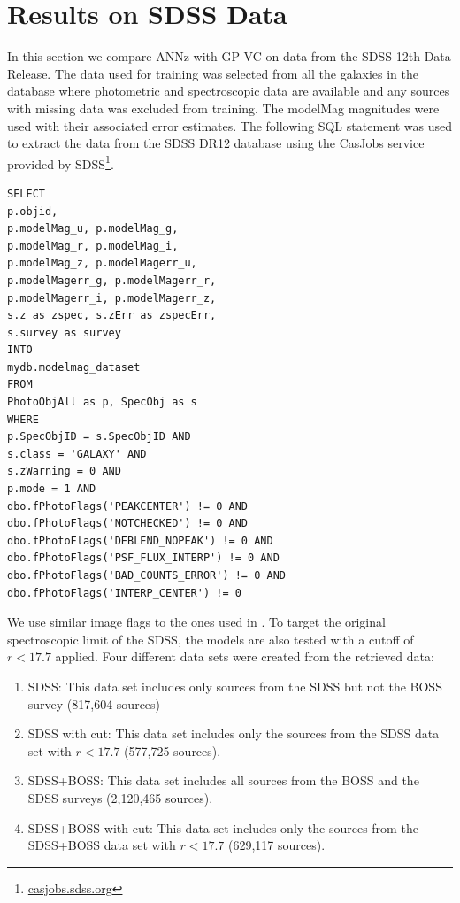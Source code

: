 \documentclass[useAMS,usenatbib,fleqn]{mn2e}
\begin{document}
\section{Results on SDSS Data}
\label{sec-experiments-sdss}

In this section we compare {\sc ANNz} with GP-VC on data from the SDSS 12th Data Release. The data used for training was selected from all the galaxies in the database where photometric and spectroscopic data are available and any sources with missing data was excluded from training. The {\selectfont modelMag} magnitudes were used with their associated error estimates. The following SQL statement was used to extract the data from the SDSS DR12 database using the CasJobs service provided by SDSS\footnote{\url{casjobs.sdss.org}}.

\begin{verbatim}
SELECT
p.objid,
p.modelMag_u, p.modelMag_g,
p.modelMag_r, p.modelMag_i,
p.modelMag_z, p.modelMagerr_u,
p.modelMagerr_g, p.modelMagerr_r,
p.modelMagerr_i, p.modelMagerr_z,
s.z as zspec, s.zErr as zspecErr,
s.survey as survey
INTO
mydb.modelmag_dataset
FROM
PhotoObjAll as p, SpecObj as s
WHERE
p.SpecObjID = s.SpecObjID AND
s.class = 'GALAXY' AND 
s.zWarning = 0 AND
p.mode = 1 AND
dbo.fPhotoFlags('PEAKCENTER') != 0 AND
dbo.fPhotoFlags('NOTCHECKED') != 0 AND
dbo.fPhotoFlags('DEBLEND_NOPEAK') != 0 AND
dbo.fPhotoFlags('PSF_FLUX_INTERP') != 0 AND
dbo.fPhotoFlags('BAD_COUNTS_ERROR') != 0 AND
dbo.fPhotoFlags('INTERP_CENTER') != 0
\end{verbatim}

We use similar image flags to the ones used in \citet{brescia2014catalogue}. To target the original spectroscopic limit of the SDSS, the models are also tested with a cutoff of $r<17.7$ applied. Four different data sets were created from the retrieved data:
\begin{enumerate}
  \item SDSS: This data set includes only sources from the SDSS but not the BOSS survey (817,604 sources) 
  \item SDSS with cut: This data set includes only the sources from the SDSS data set with $r<17.7$ (577,725 sources).
  \item SDSS+BOSS: This data set includes all sources from the BOSS and the SDSS surveys (2,120,465 sources). 
  \item SDSS+BOSS with cut: This data set includes only the sources from the SDSS+BOSS data set with $r<17.7$ (629,117 sources). 
\end{enumerate}
\end{document}
